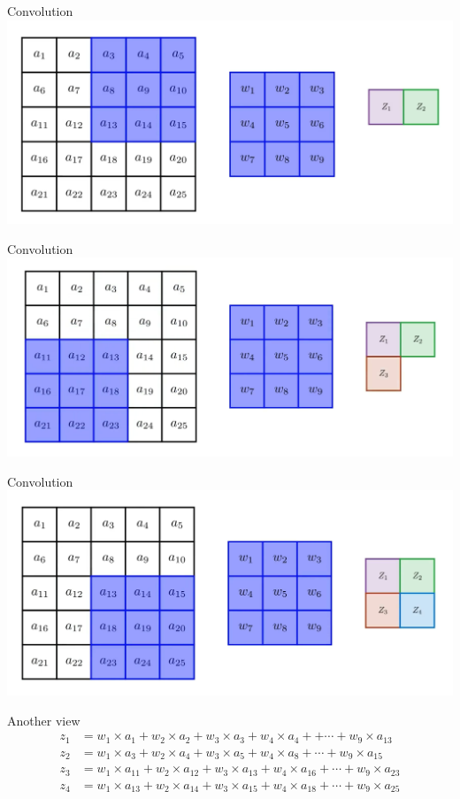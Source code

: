 \documentclass[default, aspectratio=169]{beamer}
\begin{document}
	\begin{frame}{Convolution}
		\centering
		\includegraphics[keepaspectratio, scale=0.3]{pic/BP3.png}
	\end{frame}
	
	\begin{frame}{Convolution}
		\centering
		\includegraphics[keepaspectratio, scale=0.3]{pic/BP4.png}
	\end{frame}
	
	\begin{frame}{Convolution}
		\centering
		\includegraphics[keepaspectratio, scale=0.3]{pic/BP5.png}
	\end{frame}
	
	\begin{frame}{Another view}
		\begin{align*}
			z_1 &= w_1 \times a_1 + w_2 \times a_2 + w_3 \times a_3 + w_4 \times a_4 + + \cdots + w_9 \times a_{13} \\
			z_2 &= w_1 \times a_3 + w_2 \times a_4 + w_3 \times a_5 + w_4 \times a_8 + \cdots + w_9 \times a_{15} \\
			z_3 &= w_1 \times a_{11} + w_2 \times a_{12} + w_3 \times a_{13} + w_4 \times a_{16} + \cdots + w_9 \times a_{23} \\
			z_4 &= w_1 \times a_{13} + w_2 \times a_{14} + w_3 \times a_{15} + w_4 \times a_{18} + \cdots + w_9 \times a_{25}
		\end{align*}
	\end{frame}
	
\end{document}
